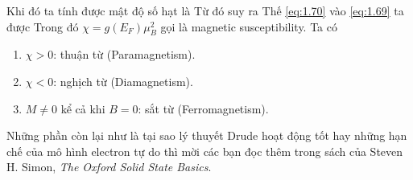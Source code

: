 \noindent Khi đó ta tính được mật độ số hạt là
Từ đó suy ra
Thế \eqref{eq:1.70} vào \eqref{eq:1.69} ta được
Trong đó $\chi = g(E_F)\mu_B^2$ gọi là magnetic susceptibility. Ta có
    \begin{enumerate}
        \item $\chi > 0$: thuận từ (Paramagnetism).
        \item $\chi < 0$: nghịch từ (Diamagnetism).
        \item $M \neq 0$ kể cả khi $B = 0$: sắt từ (Ferromagnetism).
    \end{enumerate}
Những phần còn lại như là tại sao lý thuyết Drude hoạt động tốt hay những hạn chế của mô hình electron tự do thì mời các bạn đọc thêm trong sách của Steven H. Simon, \textit{The Oxford Solid State Basics}.
\let\cleardoublepage\clearpage
